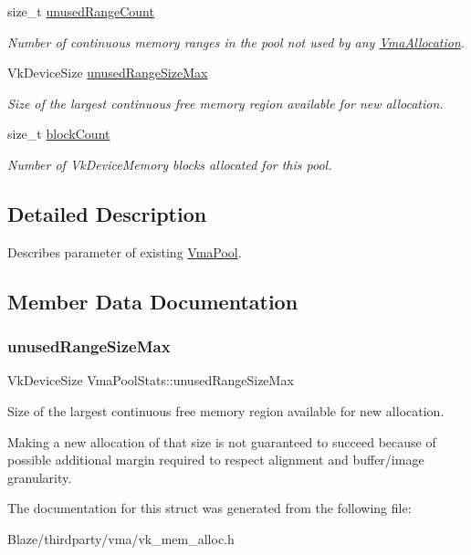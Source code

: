 \begin{DoxyCompactItemize}
size\+\_\+t \hyperlink{structVmaPoolStats_ae4f3546ffa4d1e598b64d8e6134854f4}{unused\+Range\+Count}
\begin{DoxyCompactList}\small\item\em Number of continuous memory ranges in the pool not used by any \hyperlink{structVmaAllocation}{Vma\+Allocation}. \end{DoxyCompactList}\item 
Vk\+Device\+Size \hyperlink{structVmaPoolStats_ab4c8f52dd42ab01998f60f0b6acc722b}{unused\+Range\+Size\+Max}
\begin{DoxyCompactList}\small\item\em Size of the largest continuous free memory region available for new allocation. \end{DoxyCompactList}\item 
\mbox{\label{structVmaPoolStats_aa0b5cb45cef6f18571cefb03b9a230e7}} 
size\+\_\+t \hyperlink{structVmaPoolStats_aa0b5cb45cef6f18571cefb03b9a230e7}{block\+Count}
\begin{DoxyCompactList}\small\item\em Number of {\ttfamily Vk\+Device\+Memory} blocks allocated for this pool. \end{DoxyCompactList}\end{DoxyCompactItemize}


\subsection{Detailed Description}
Describes parameter of existing \hyperlink{structVmaPool}{Vma\+Pool}. 

\subsection{Member Data Documentation}
\mbox{\label{structVmaPoolStats_ab4c8f52dd42ab01998f60f0b6acc722b}} 
\subsubsection{\texorpdfstring{unused\+Range\+Size\+Max}{unusedRangeSizeMax}}
{\footnotesize\ttfamily Vk\+Device\+Size Vma\+Pool\+Stats\+::unused\+Range\+Size\+Max}



Size of the largest continuous free memory region available for new allocation. 

Making a new allocation of that size is not guaranteed to succeed because of possible additional margin required to respect alignment and buffer/image granularity. 

The documentation for this struct was generated from the following file\+:\begin{DoxyCompactItemize}
\item 
Blaze/thirdparty/vma/vk\+\_\+mem\+\_\+alloc.\+h\end{DoxyCompactItemize}
